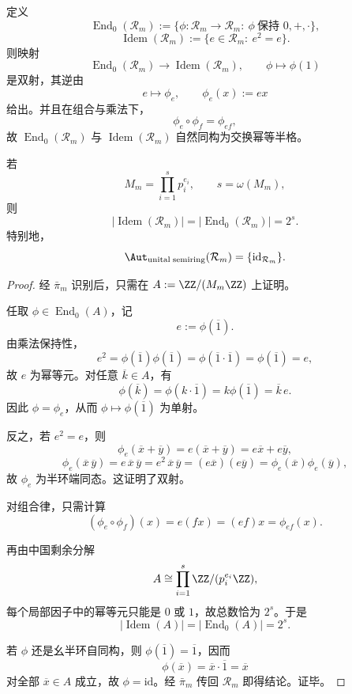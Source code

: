 \begin{theorem}[折叠同余半环的非幺端同态分类与幺自同构刚性]\label{thm:xi-fold-congruence-unital-automorphism-rigidity}
定义
\[
\operatorname{End}_0(\mathcal R_m)
:=
\{\phi:\mathcal R_m\to\mathcal R_m:\ \phi\ \text{保持 }0,+,\cdot\},
\]
\[
\operatorname{Idem}(\mathcal R_m)
:=
\{e\in \mathcal R_m:\ e^2=e\}.
\]
则映射
\[
\operatorname{End}_0(\mathcal R_m)\longrightarrow \operatorname{Idem}(\mathcal R_m),
\qquad
\phi\longmapsto \phi(1)
\]
是双射，其逆由
\[
e\longmapsto \phi_e,
\qquad
\phi_e(x):=ex
\]
给出。并且在组合与乘法下，
\[
\phi_e\circ \phi_f=\phi_{ef},
\]
故 \(\operatorname{End}_0(\mathcal R_m)\) 与 \(\operatorname{Idem}(\mathcal R_m)\) 自然同构为交换幂等半格。

若
\[
M_m=\prod_{i=1}^{s}p_i^{e_i},
\qquad s=\omega(M_m),
\]
则
\[
|\operatorname{Idem}(\mathcal R_m)|
=
|\operatorname{End}_0(\mathcal R_m)|
=
2^s.
\]
特别地，
\[
\Aut_{\mathrm{unital\; semiring}}(\mathcal R_m)=\{\mathrm{id}_{\mathcal R_m}\}.
\]
\end{theorem}
\begin{proof}
经 \(\bar\pi_m\) 识别后，只需在 \(A:=\ZZ/(M_m\ZZ)\) 上证明。

任取 \(\phi\in \operatorname{End}_0(A)\)，记
\[
e:=\phi(\overline 1).
\]
由乘法保持性，
\[
e^2=\phi(\overline 1)\phi(\overline 1)=\phi(\overline 1\cdot \overline 1)=\phi(\overline 1)=e,
\]
故 \(e\) 为幂等元。对任意 \(\overline k\in A\)，有
\[
\phi(\overline k)
=
\phi(k\cdot \overline 1)
=
k\phi(\overline 1)
=
\overline k\,e.
\]
因此 \(\phi=\phi_e\)，从而 \(\phi\mapsto \phi(\overline 1)\) 为单射。

反之，若 \(e^2=e\)，则
\[
\phi_e(\overline x+\overline y)=e(\overline x+\overline y)=e\overline x+e\overline y,
\]
\[
\phi_e(\overline x\,\overline y)=e\,\overline x\,\overline y
=
e^2\,\overline x\,\overline y
=
(e\overline x)(e\overline y)
=
\phi_e(\overline x)\phi_e(\overline y),
\]
故 \(\phi_e\) 为半环端同态。这证明了双射。

对组合律，只需计算
\[
(\phi_e\circ \phi_f)(x)=e(fx)=(ef)x=\phi_{ef}(x).
\]

再由中国剩余分解
\[
A\cong \prod_{i=1}^{s}\ZZ/(p_i^{e_i}\ZZ),
\]
每个局部因子中的幂等元只能是 \(0\) 或 \(1\)，故总数恰为 \(2^s\)。于是
\[
|\operatorname{Idem}(A)|=|\operatorname{End}_0(A)|=2^s.
\]

若 \(\phi\) 还是幺半环自同构，则 \(\phi(\overline 1)=\overline 1\)，因而
\[
\phi(\overline x)=\overline x\cdot \overline 1=\overline x
\]
对全部 \(\overline x\in A\) 成立，故 \(\phi=\mathrm{id}\)。经 \(\bar\pi_m\) 传回 \(\mathcal R_m\) 即得结论。证毕。
\end{proof}

